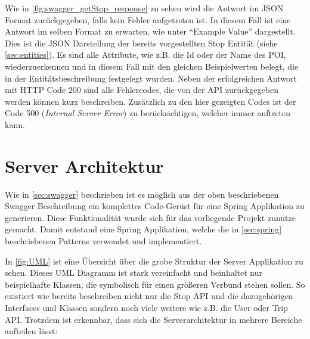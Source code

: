 \begin{itemize}
	Wie in \autoref{fig:swagger_getStop_response} zu sehen wird die Antwort im \acs{JSON} Format zurückgegeben, falls kein Fehler aufgetreten ist. In diesem Fall ist eine Antwort im selben Format zu erwarten, wie unter \enquote{Example Value} dargestellt. Dies ist die \acs{JSON} Darstellung der bereits vorgestellten Stop Entität (siehe \autoref{sec:entities}). Es sind alle Attribute, wie z.B. die Id oder der Name des \acs{POI}, wiederzuerkennen und in diesem Fall mit den gleichen Beispielwerten belegt, die in der Entitätsbeschreibung festgelegt wurden. Neben der erfolgreichen Antwort mit \acs{HTTP} Code 200 sind alle Fehlercodes, die von der API zurückgegeben werden können kurz beschreiben. Zusätzlich zu den hier gezeigten Codes ist der Code 500 (\textit{Internal Server Error}) zu berücksichtigen, welcher immer auftreten kann.
	
	\newpage
	
	\end{itemize}
		
	\section{Server Architektur}
	
	Wie in \autoref{sec:swagger} beschrieben ist es möglich aus der oben beschriebenen Swagger Beschreibung ein komplettes Code-Gerüst für eine Spring Applikation zu generieren. Diese Funktionalität wurde sich für das vorliegende Projekt zunutze gemacht. Damit entstand eine Spring Applikation, welche die in \autoref{sec:spring} beschriebenen Patterns verwendet und implementiert.
	
	\vspace{0.25cm}
	
	In \autoref{fig:UML} ist eine Übersicht über die grobe Struktur der Server Applikation zu sehen. Dieses UML Diagramm ist stark vereinfacht und beinhaltet nur beispielhafte Klassen, die symbolisch für einen größeren Verbund stehen sollen. So existiert wie bereits beschreiben nicht nur die Stop API und die dazugehörigen Interfaces und Klassen sondern noch viele weitere wie z.B. die User oder Trip API. Trotzdem ist erkennbar, dass sich die Serverarchitektur in mehrere Bereiche aufteilen lässt:
	
